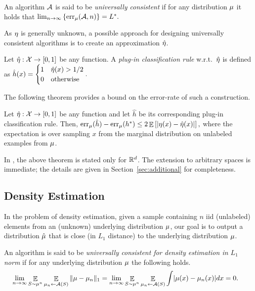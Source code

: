 \documentclass[12pt,a4paper,oneside,onecolumn]{book}
\begin{document}
\begin{definition}
An algorithm $\mathcal{A}$ is said to be \emph{universally consistent} if for any distribution $\mu$ it holds that
$
\lim_{n\to\infty}\left\{\operatorname{err}_\mu(\mathcal{A},n)\right\} = L^*.
$
\end{definition}

As $\eta$ is generally unknown, a possible approach for designing universally consistent algorithms is to create an approximation $\hat{\eta}$.

\begin{definition}
Let $\hat{\eta}:\mathcal{X}\rightarrow[0,1]$ be any function. 
A \emph{plug-in classification rule} w.r.t.\ $\hat{\eta}$ is defined as 
$
\hat{h}(x) = \begin{cases}
  1  & \hat{\eta}(x) > 1/2 \\
  0 & \text{otherwise}
\end{cases}.
$
\end{definition}

The following theorem provides a bound on the error-rate of such a construction. 
\begin{theorem}
Let $\hat{\eta}:\mathcal{X}\rightarrow[0,1]$ be any function and let $\hat{h}$ be its corresponding plug-in classification rule. Then,
\label{thm:plugin}
  $\operatorname{err}_\mu(\hat{h}) - \operatorname{err}_\mu(h^*) 
  \leq 
  2 \mathop{\mathbb{E}}\left[\lvert\eta(x)-\hat{\eta}(x)\rvert\right],$ 
  where the expectation is over sampling $x$ from the marginal distribution on unlabeled examples from $\mu$.
\end{theorem}

In \cite{devroye2013probabilistic}, the above theorem is stated only for $\mathbb{R}^d$. The extension to arbitrary spaces is immediate; the details are given in Section~\ref{sec:additional} for completeness.

\subsection{Density Estimation}

In the problem of density estimation, given a sample containing $n$ iid (unlabeled) elements from an (unknown) underlying distribution $\mu$, our goal is to output a distribution $\hat{\mu}$ that is close (in $L_1$ distance) to the underlying distribution $\mu$. 

\begin{definition}
An algorithm is said to be {\em universally consistent for density estimation in $L_1$ norm} if for any underlying distribution $\mu$ the following holds.
\begin{align*}
&\lim_{n\to\infty}
\mathop{\mathbb{E}}_{S\sim\mu^n}
\mathop{\mathbb{E}}_{\mu_n\leftarrow\mathcal{A}(S)}
\| \mu - \mu_n\|_{1} 
=
\lim_{n\to\infty}
\mathop{\mathbb{E}}_{S\sim\mu^n}
\mathop{\mathbb{E}}_{\mu_n\leftarrow\mathcal{A}(S)}
\int \lvert\mu(x) - \mu_n(x)\rvert dx = 0.
\end{align*}
\end{definition}
\end{document}
